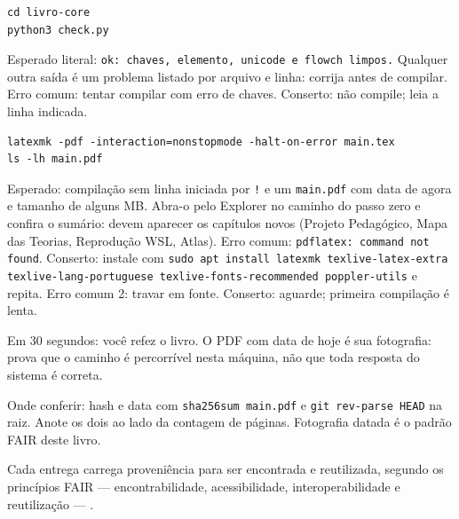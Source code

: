
\begin{metodo}
\begin{verbatim}
cd livro-core
python3 check.py
\end{verbatim}
Esperado literal: \texttt{ok: chaves, elemento, unicode e flowch limpos.} Qualquer outra saída é um problema listado por arquivo e linha: corrija antes de compilar. Erro comum: tentar compilar com erro de chaves. Conserto: não compile; leia a linha indicada.
\end{metodo}


\begin{metodo}
\begin{verbatim}
latexmk -pdf -interaction=nonstopmode -halt-on-error main.tex
ls -lh main.pdf
\end{verbatim}
Esperado: compilação sem linha iniciada por \texttt{!} e um \texttt{main.pdf} com data de agora e tamanho de alguns MB. Abra-o pelo Explorer no caminho do passo zero e confira o sumário: devem aparecer os capítulos novos (Projeto Pedagógico, Mapa das Teorias, Reprodução WSL, Atlas). Erro comum: \texttt{pdflatex: command not found}. Conserto: instale com \texttt{sudo apt install latexmk texlive-latex-extra texlive-lang-portuguese texlive-fonts-recommended poppler-utils} e repita. Erro comum 2: travar em fonte. Conserto: aguarde; primeira compilação é lenta.
\end{metodo}

\begin{dicaleigo}
Em 30 segundos: você refez o livro. O PDF com data de hoje é sua fotografia: prova que o caminho é percorrível nesta máquina, não que toda resposta do sistema é correta.
\end{dicaleigo}

\begin{paratecnico}
Onde conferir: hash e data com \texttt{sha256sum main.pdf} e \texttt{git rev-parse HEAD} na raiz. Anote os dois ao lado da contagem de páginas. Fotografia datada é o padrão FAIR deste livro.
\end{paratecnico}

Cada entrega carrega proveniência para ser encontrada e reutilizada, segundo os princípios FAIR — encontrabilidade, acessibilidade, interoperabilidade e reutilização — .

